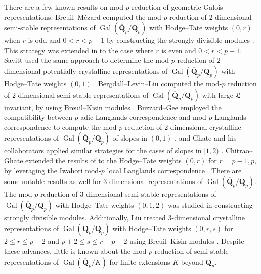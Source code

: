 \documentclass[11pt]{amsart}
\theoremstyle{definition}
\numberwithin{equation}{subsection}
\theoremstyle{plain}
\theoremstyle{plain}
\theoremstyle{plain}
\theoremstyle{plain}
\theoremstyle{plain}
\theoremstyle{plain}
\theoremstyle{plain}
\theoremstyle{plain}
\theoremstyle{plain}
\theoremstyle{plain}
\theoremstyle{plain}
\theoremstyle{plain}
\theoremstyle{definition}
\theoremstyle{definition}
\theoremstyle{definition}
\theoremstyle{remark}
\renewcommand{\(}{\textup{(}}
\renewcommand{\)}{\textup{)}}
\DeclareMathOperator{\Gal}{Gal}
\newcommand{\Q}{\mathbf{Q}}
\newcommand{\fL}{\mathfrak{L}}
\begin{document}
There are a few known results on mod-$p$ reduction of geometric Galois representations. Breuil--M\'ezard computed the mod-$p$ reduction of $2$-dimensional semi-stable representations of $\Gal(\overline{\Q}_p/\Q_p)$ with Hodge--Tate weights $(0,r)$ when $r$ is odd and $0<r<p-1$ by constructing the strongly divisible modules \cite{BM}. This strategy was extended in \cite{GP,LP} to the case where $r$ is even and $0<r<p-1$. Savitt used the same approach to determine the mod-$p$ reduction of $2$-dimensional potentially crystalline representations of $\Gal(\overline{\Q}_p/\Q_p)$ with Hodge--Tate weights $(0,1)$ \cite{Savitt}. Bergdall--Levin--Liu computed the mod-$p$ reduction of $2$-dimensional semi-stable representations of $\Gal(\overline{\Q}_p/\Q_p)$ with large $\fL$-invariant, by using Breuil--Kisin modules \cite{BLL}. Buzzard--Gee employed the compatibility between $p$-adic Langlands correspondence and mod-$p$ Langlands correspondence to compute the mod-$p$ reduction of $2$-dimensional crystalline representations of $\Gal(\overline{\Q}_p/\Q_p)$ of slopes in $(0,1)$ \cite{BG09,BG13}, and Ghate and his collaborators applied similar strategies for the cases of slopes in $[1,2)$ \cite{BhG,BGR,GaG,GRa}. Chitrao--Ghate extended the results of \cite{BM,GP,LP} to the Hodge--Tate weights $(0,r)$ for $r=p-1,p$, by leveraging the Iwahori mod-$p$ local Langlands correspondence \cite{CG}. There are some notable results as well for $3$-dimensional representations of $\Gal(\overline{\Q}_p/\Q_p)$. The mod-$p$ reduction of $3$-dimensional semi-stable representations of $\Gal(\overline{\Q}_p/\Q_p)$ with Hodge--Tate weights $(0,1,2)$ was studied in \cite{Par} constructing strongly divisible modules. Additionally, Liu treated $3$-dimensional crystalline representations of $\Gal(\overline{\Q}_p/\Q_p)$ with Hodge--Tate weights $(0,r,s)$ for $2\leq r\leq p-2$ and $p+2\leq s\leq r+p-2$ using Breuil--Kisin modules \cite{Liu}. Despite these advances, little is known about the mod-$p$ reduction of semi-stable representations of $\Gal(\overline{\Q}_p/K)$ for finite extensions $K$ beyond $\Q_p$.
\end{document}
